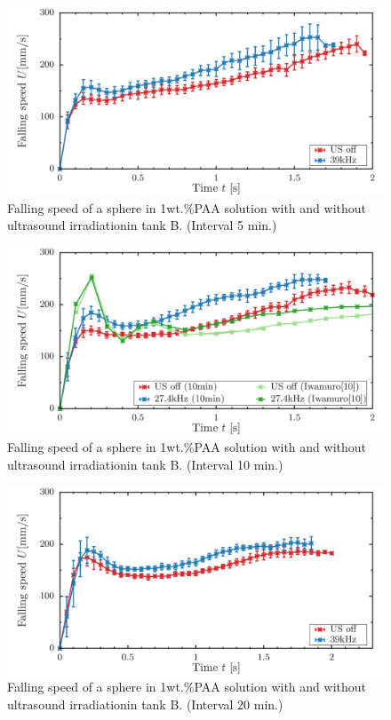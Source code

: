 \begin{figure}[ht]
    \centering
    \includegraphics[width=14cm,clip]{./4-Results/s1-5.png}
    \caption{Falling speed of a sphere in 1wt.\%PAA solution with and without ultrasound irradiationin tank B. (Interval 5 min.)}
    \label{fig:falling-5}
\end{figure}
\begin{figure}[ht]
    \centering
    \includegraphics[width=14cm,clip]{./4-Results/s1-10.png}
    \caption{Falling speed of a sphere in 1wt.\%PAA solution with and without ultrasound irradiationin tank B. (Interval 10 min.)}
    \label{fig:falling-10}
\end{figure}
\begin{figure}[ht]
    \centering
    \includegraphics[width=14cm,clip]{./4-Results/s1-20.png}
    \caption{Falling speed of a sphere in 1wt.\%PAA solution with and without ultrasound irradiationin tank B. (Interval 20 min.)}
    \label{fig:falling-20}
\end{figure}

